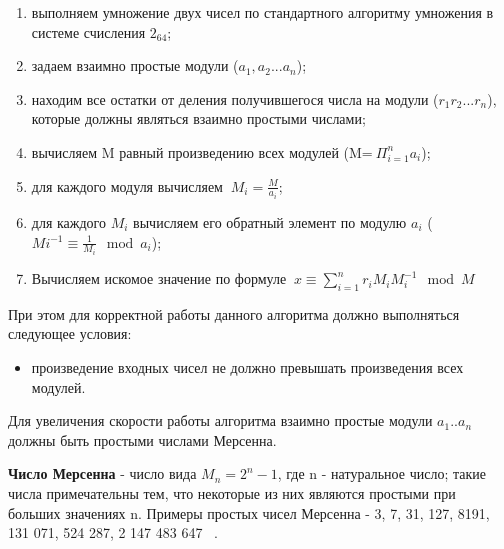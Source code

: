 \documentclass[14pt, russian]{scrartcl}
\begin{document}
\begin{enumerate}
    \item выполняем умножение двух чисел по стандартного алгоритму умножения в системе счисления $2_{64}$;
    \item задаем взаимно простые модули ($a_{1},a_{2}...a_{n}$);
    \item находим все остатки от деления получившегося числа на модули ($r_{1}r_{2}...r_{n}$), которые должны являться взаимно простыми числами;
    \item вычисляем M равный произведению всех модулей (M=$\displaystyle\ \Pi_{i=1}^{n}a_{i}$);
    \item для каждого модуля вычисляем  $\displaystyle\ M_{i}=\frac{M}{a_{i}}$;
    \item для каждого $M_{i}$ вычисляем его обратный элемент по модулю $a_{i}$  ($M{i}^{-1}\equiv\frac{1}{M_{i}}\mod a_{i}$);
    \item Вычисляем искомое значение по формуле $\displaystyle\ {x}\equiv \sum_{i=1}^{n} {r}_{i}{M}_{i}{M}_{i}^{-1} \mod {M}$
\end{enumerate}
При этом для корректной работы данного алгоритма должно выполняться следующее условия:
\begin{itemize}
    \item произведение входных чисел не должно превышать произведения всех модулей.
\end{itemize}
Для увеличения скорости работы алгоритма взаимно простые модули $a_{1}..a_{n}$ должны быть простыми числами Мерсенна. 
\Newline

\textbf{Число Мерсенна} - число вида $M_{n}=2^{n}-1$, где n - натуральное число; такие числа примечательны тем, что некоторые из них являются простыми при больших значениях n. Примеры простых чисел Мерсенна - 3, 7, 31, 127, 8191, 131 071, 524 287, 2 147 483 647 ~\cite{Mersen}.
\end{document}
